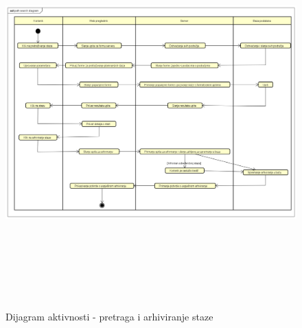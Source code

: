			 \begin{figure}[H]
			 	\includegraphics[scale=0.6, height=150mm, width=165mm]{dijagrami/activity/path search diagram.png} %
			 	\centering
			 	\caption{Dijagram aktivnosti - pretraga i arhiviranje staze}
			 	\label{fig:dijagrami_aktivnosti1}
			 \end{figure}
		 
